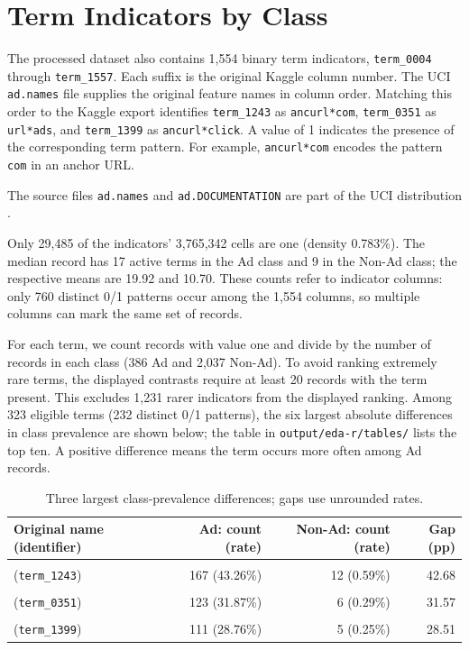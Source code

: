 \section{Term Indicators by Class}
The processed dataset also contains 1,554 binary term indicators,
\texttt{term\_0004} through \texttt{term\_1557}. Each suffix is the
original Kaggle column number. The UCI \texttt{ad.names} file supplies
the original feature names in column order. Matching this order to the
Kaggle export identifies \texttt{term\_1243} as \texttt{ancurl*com},
\texttt{term\_0351} as \texttt{url*ads}, and
\texttt{term\_1399} as \texttt{ancurl*click}.
A value of 1 indicates the presence of the corresponding term pattern.
For example, \texttt{ancurl*com} encodes the pattern \texttt{com}
in an anchor URL.

The source files \texttt{ad.names} and \texttt{ad.DOCUMENTATION} are
part of the UCI distribution \citep{kushmerick1999}.

Only 29,485 of the indicators' 3,765,342 cells are one (density 0.783\%).
The median record has 17 active terms in the Ad class and 9 in the
Non-Ad class; the respective means are 19.92 and 10.70.
These counts refer to indicator columns: only 760 distinct 0/1 patterns
occur among the 1,554 columns, so multiple columns can mark the same
set of records.


For each term, we count records with value one and divide by the number
of records in each class (386 Ad and 2,037 Non-Ad). To avoid ranking
extremely rare terms, the
displayed contrasts require at least 20 records with the term present.
This excludes 1,231 rarer indicators from the displayed ranking.
Among 323 eligible terms (232 distinct 0/1 patterns), the six largest
absolute differences in class prevalence are shown below; the table in
\texttt{output/eda-r/tables/} lists the top ten. A positive difference
means the term occurs more often among Ad records.

\begin{table}[H]
\centering
\small
\caption{Three largest class-prevalence differences; gaps use unrounded rates.}
\label{tab:eda-terms}
\begin{tabular}{lrrr}
\toprule
Original name (identifier) & Ad: count (rate) & Non-Ad: count (rate) & Gap (pp)\\
\midrule
\shortstack[l]{\texttt{ancurl*com}\\(\texttt{term\_1243})} & 167 (43.26\%) & 12 (0.59\%) & 42.68\\
\shortstack[l]{\texttt{url*ads}\\(\texttt{term\_0351})} & 123 (31.87\%) & 6 (0.29\%) & 31.57\\
\shortstack[l]{\texttt{ancurl*click}\\(\texttt{term\_1399})} & 111 (28.76\%) & 5 (0.25\%) & 28.51\\
\bottomrule
\end{tabular}
\end{table}

